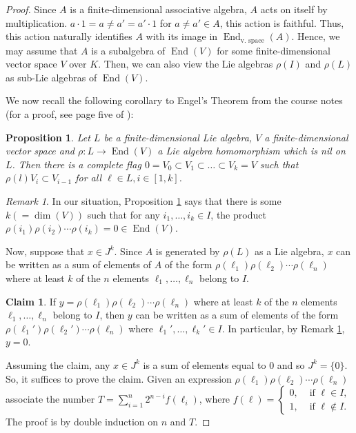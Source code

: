 \documentclass[10pt]{amsart}
\newtheorem{prop}[thm]{Proposition}
\theoremstyle{definition}
\newtheorem{claim}{Claim}
\theoremstyle{remark}
\newtheorem{remark}[thm]{Remark}
\numberwithin{equation}{section}
\DeclareMathOperator{\End}{End}
\begin{document}
\begin{proof}
Since $A$ is a finite-dimensional associative algebra, $A$ acts on itself by multiplication. $a \cdot 1 = a \neq a' = a' \cdot 1$ for $a \neq a' \in A$, this action is faithful. Thus, this action naturally identifies $A$ with its image in $\End_{\text{v. space}}(A)$. Hence, we may assume that $A$ is a subalgebra of $\End(V)$ for some finite-dimensional vector space $V$ over $K$. Then, we can also view the Lie algebras $\rho(I)$ and $\rho(L)$ as sub-Lie algebras of $\End(V)$.

We now recall the following corollary to Engel's Theorem from the course notes (for a proof, see page five of \cite{Lusztig15.1}):
\begin{prop} \label{prop:EngelCorollary}
Let $L$ be a finite-dimensional Lie algebra, $V$ a finite-dimensional vector space and $\rho: L \to \End(V)$ a Lie algebra homomorphism which is nil on $L$. Then there is a complete flag $0 = V_0 \subset V_1 \subset \dots \subset V_k = V$ such that $\rho(l)V_i \subset V_{i-1}$ for all $\ell \in L, i \in [1,k]$.
\end{prop}

\begin{remark} \label{rem:WhatEngelMeans} 
In our situation, Proposition \ref{prop:EngelCorollary} says that there is some $k (= \dim(V))$ such that for any $i_1, \dots, i_k \in I$, the product $\rho(i_1) \rho(i_2) \cdots \rho(i_k) = 0 \in \End(V)$. 
\end{remark}

Now, suppose that $x \in J^{k}$. Since $A$ is generated by $\rho(L)$ as a Lie algebra, $x$ can be written as a sum of elements of $A$ of the form $\rho(\ell_1)\rho(\ell_2) \cdots \rho(\ell_{n})$ where at least $k$ of the $n$ elements $\ell_1, \dots, \ell_n$ belong to $I$. 

\begin{claim} \label{claim:ThingsAreZero}
If $y = \rho(\ell_1)\rho(\ell_2) \cdots \rho(\ell_{n})$ where at least $k$ of the $n$ elements $\ell_1, \dots, \ell_n$ belong to $I$, then $y$ can be written as a sum of elements of the form $\rho(\ell_1')\rho(\ell_2') \cdots \rho(\ell_{n})$ where $\ell_1', \dots, \ell_{k}' \in I$. In particular, by Remark \ref{rem:WhatEngelMeans}, $y = 0$.
\end{claim}

Assuming the claim, any $x \in J^k$ is a sum of elements equal to $0$ and so $J^k = \{0\}$. So, it suffices to prove the claim. Given an expression $\rho(\ell_1)\rho(\ell_2) \cdots \rho(\ell_{n})$ associate the number $T = \sum_{i=1}^{n} 2^{n-i} f(\ell_{i})$, where $f(\ell) = \begin{cases} 0, & \text{ if } \ell \in I, \\
1, & \text{ if } \ell \notin I. \end{cases}$ The proof is by double induction on $n$ and $T$. 


\end{proof}
\end{document}
